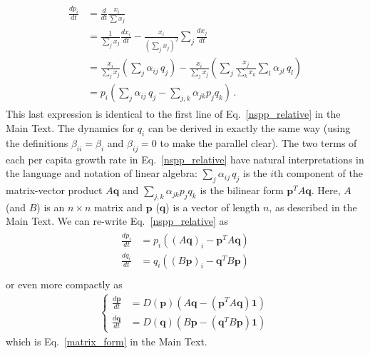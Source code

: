 \documentclass[11pt]{article}
\begin{document}
\begin{align} \label{derive_relative}
\begin{split}
	\frac{dp_i}{dt} &= \frac{d}{dt} \frac{x_i}{\sum x_j}\\  
	&= \frac{1}{\sum_j x_j} \frac{dx_i}{dt} - \frac{x_i}{(\sum_j x_j)^2} \sum_j \frac{dx_j}{dt} \\
	&= \frac{x_i}{\sum_j x_j} \left( \sum_{j} \alpha_{ij} \, q_j \right) - \frac{x_i}{\sum_j x_j} \left(\sum_j \frac{x_j}{\sum_k x_k} \sum_{l} \alpha_{jl} \, q_l \right)\\
	&= p_i \left(\sum_{j} \alpha_{ij} \, q_j -  \sum_{j, k} \alpha_{jk} p_j  q_k \right) \, .
\end{split}
\end{align}
This last expression is identical to the first line of Eq.~\ref{nspp_relative} in the Main Text. The dynamics for $q_i$ can be derived in exactly the same way (using the definitions $\beta_{ii} = \beta_i$ and $\beta_{ij} = 0$ to make the parallel clear). The two terms of each per capita growth rate in Eq.~\ref{nspp_relative} have natural interpretations in the language and notation of linear algebra: $\sum_{j} \alpha_{ij} \, q_j$ is the $i$th component of the matrix-vector product $A \bm{q}$ and $\sum_{j, k} \alpha_{jk} p_j  q_k$ is the bilinear form $\bm{p}^T A \bm{q}$. Here, $A$ (and $B$) is an $n \times n$ matrix and $\bm{p}$ ($\bm{q}$) is a vector of length $n$, as described in the Main Text. We can re-write Eq.~\ref{nspp_relative} as
\begin{align}
\begin{split}
	\frac{dp_i}{dt} &= p_i \left((A \bm{q})_i - \bm{p}^T A \bm{q} \right) \\
	\frac{dq_i}{dt} &= q_i \left((B \bm{p})_i - \bm{q}^T B \bm{p} \right) \\
\end{split}
\end{align}
or even more compactly as
\begin{align}
\begin{cases}
\frac{d\bm{p}}{dt} &= D(\bm{p}) \left(A \bm{q} - (\bm{p}^T A \bm{q}) \bm{1} \right) \\
\frac{d\bm{q}}{dt} &= D(\bm{q}) \left(B \bm{p} - (\bm{q}^T B \bm{p}) \bm{1}  \right) \,
\end{cases}
\end{align}
which is Eq.~\ref{matrix_form} in the Main Text.
\end{document}
